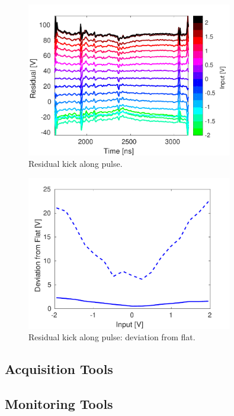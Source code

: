 \begin{figure}
  \centering
  \includegraphics[width=0.8\textwidth]{Figures/commissioning/residualKick_Traces}
  \caption{Residual kick along pulse.}
  \label{f:ampClosure}
\end{figure}

\begin{figure}
  \centering
  \includegraphics[width=0.8\textwidth]{Figures/commissioning/residualKick_Flatness}
  \caption{Residual kick along pulse: deviation from flat.}
  \label{f:ampClosureFlatness}
\end{figure}


\subsection{Acquisition Tools}
\label{ss:acqTools}

\subsection{Monitoring Tools}
\label{ss:monTools}

